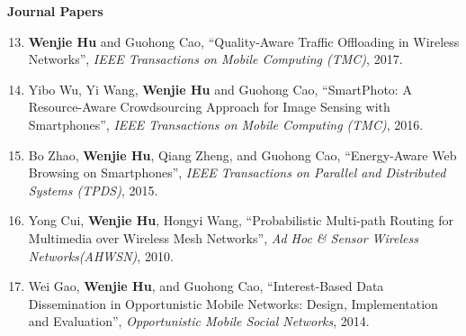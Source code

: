 \documentclass[margin,line]{res}
\begin{document}
\begin{resume}
{\bf Journal Papers}
\vspace*{.05in}
\begin{enumerate} [leftmargin=5mm]%
\setcounter{enumi}{12}
\item {\bf Wenjie Hu} and Guohong Cao, ``Quality-Aware Traffic Offloading in Wireless Networks'', {\em IEEE Transactions on Mobile Computing (TMC)}, 2017.
\item Yibo Wu, Yi Wang, {\bf Wenjie Hu} and Guohong Cao, ``SmartPhoto: A Resource-Aware Crowdsourcing Approach for Image Sensing with Smartphones'', {\em IEEE Transactions on Mobile Computing (TMC)}, 2016. %
\item Bo Zhao, {\bf Wenjie Hu}, Qiang Zheng, and Guohong Cao, ``Energy-Aware Web Browsing on Smartphones'', {\em IEEE Transactions on Parallel and Distributed Systems (TPDS)}, 2015. %
\item Yong Cui, {\bf Wenjie Hu}, Hongyi Wang, ``Probabilistic Multi-path Routing for Multimedia over Wireless Mesh Networks'', {\em Ad Hoc \& Sensor Wireless Networks(AHWSN)}, 2010.
\item Wei Gao, {\bf Wenjie Hu}, and Guohong Cao, ``Interest-Based Data Dissemination in Opportunistic Mobile Networks: Design, Implementation and Evaluation'', {\em Opportunistic Mobile Social Networks}, 2014. %
\end{enumerate}
%
%



\end{resume}
\end{document}
